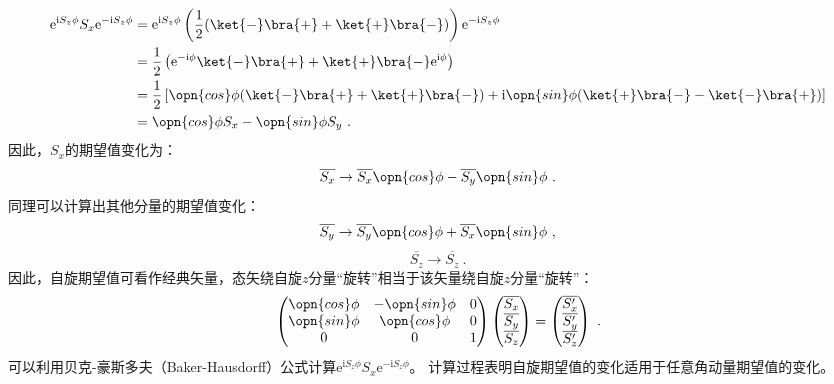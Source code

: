\begin{equation}
\begin{aligned}
\mathrm e^{\mathrm i S_z\phi}S_x\mathrm e^{-\mathrm i S_z\phi}&=\mathrm e^{\mathrm i S_z\phi}\left(\frac{1}{2}(\ket{-}\bra{+}+\ket{+}\bra{-})\right)\mathrm e^{-\mathrm i S_z\phi}\\
 &=\frac{1}{2}\left(\mathrm e^{-\mathrm i \phi}\ket{-}\bra{+}+\ket{+}\bra{-}\mathrm e^{\mathrm i \phi}\right)\\
 &=\frac{1}{2}\left[\opn{cos}\phi(\ket{-}\bra{+}+\ket{+}\bra{-})+\mathrm i\opn{sin}\phi(\ket{+}\bra{-}-\ket{-}\bra{+})\right]\\
 &=\opn{cos}\phi S_x-\opn{sin}\phi S_y~.
\end{aligned}
\end{equation}
因此，$S_x$的期望值变化为：
\begin{equation}
\overline{S_x}\rightarrow  \overline{S_x}\opn{cos}\phi-\overline{S_y}\opn{sin}\phi~.
\end{equation}
同理可以计算出其他分量的期望值变化：
\begin{equation}
\overline{S_y}\rightarrow \overline{S_y}\opn{cos}\phi+\overline{S_x}\opn{sin}\phi~,
\end{equation}
\begin{equation}
\overline{S_z}\rightarrow \overline{S_z}~.
\end{equation}
因此，自旋期望值可看作经典矢量，态矢绕自旋$z$分量“旋转”相当于该矢量绕自旋$z$分量“旋转”：
\begin{equation}
\begin{pmatrix}
 \opn{cos}\phi &-\opn{sin}\phi  &0 \\
  \opn{sin}\phi & \opn{cos}\phi  & 0\\
  0& 0 &1
\end{pmatrix}
\begin{pmatrix}
 \overline{S_x}\\
  \overline{S_y}\\
 \overline{S_z}
\end{pmatrix}
=
\begin{pmatrix}
  \overline{S'_x}\\
  \overline{S'_y}\\
 \overline{S'_z}
\end{pmatrix}~.
\end{equation}
可以利用贝克-豪斯多夫（Baker-Hausdorff）公式计算$\mathrm e^{\mathrm i S_z\phi}S_x\mathrm e^{-\mathrm i S_z\phi}$。
计算过程表明自旋期望值的变化适用于任意角动量期望值的变化。

